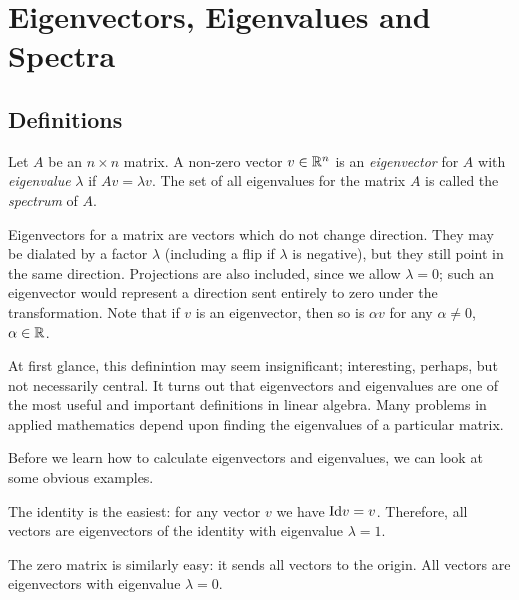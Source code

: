 \documentclass[fleqn]{report}
\begin{document}
\chapter{Eigenvectors, Eigenvalues and Spectra}

\section{Definitions}

\begin{defn}
Let $A$ be an $n \times n$ matrix. A non-zero vector $v \in
\mathbb{R}^n$ is an \emph{eigenvector} for $A$ with \emph{eigenvalue}
$\lambda$ if $Av = \lambda v$. The set of all eigenvalues for
the matrix $A$ is called the \emph{spectrum} of $A$.
\end{defn}

Eigenvectors for a matrix are vectors which do not change
direction. They may be dialated by a factor $\lambda$
(including a flip if $\lambda$ is negative), but they still
point in the same direction. Projections are also included,
since we allow $\lambda = 0$; such an eigenvector would
represent a direction sent entirely to zero under the
transformation. Note that if $v$ is an eigenvector, then so
is $\alpha v$ for any $\alpha \neq 0$, $\alpha \in \mathbb{R}$. 

At first glance, this definintion may seem insignificant;
interesting, perhaps, but not necessarily central. It turns
out that eigenvectors and eigenvalues are one of the most
useful and important definitions in linear algebra. Many
problems in applied mathematics depend upon finding the
eigenvalues of a particular matrix.

Before we learn how to calculate eigenvectors
and eigenvalues, we can look at some obvious examples. 

\begin{example}
The identity is the easiest: for any vector $v$ we have $\mathrm{Id} v =
v$. Therefore, all vectors are eigenvectors of the identity
with eigenvalue $\lambda = 1$. 
\end{example}

\begin{example}
The zero matrix is similarly easy: it sends all vectors to the
origin. All vectors are eigenvectors with eigenvalue $\lambda = 0$.
\end{example}
\end{document}
